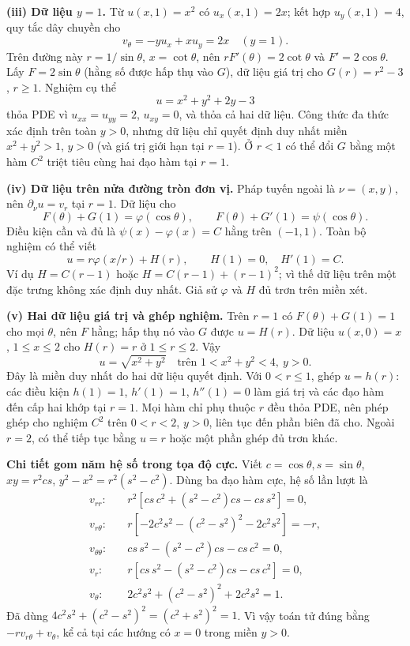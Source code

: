 \textbf{(iii) Dữ liệu $y=1$.} Từ $u(x,1)=x^2$ có $u_x(x,1)=2x$; kết hợp $u_y(x,1)=4$, quy tắc dây chuyền cho
\[v_\theta=-y u_x+xu_y=2x\quad(y=1).\]
Trên đường này $r=1/\sin\theta$, $x=\cot\theta$, nên $rF'(\theta)=2\cot\theta$ và $F'=2\cos\theta$. Lấy $F=2\sin\theta$ (hằng số được hấp thụ vào $G$), dữ liệu giá trị cho $G(r)=r^2-3$, $r\ge1$. Nghiệm cụ thể
\[\boxed{u=x^2+y^2+2y-3}\]
thỏa PDE vì $u_{xx}=u_{yy}=2$, $u_{xy}=0$, và thỏa cả hai dữ liệu. Công thức đa thức xác định trên toàn $y>0$, nhưng dữ liệu chỉ quyết định duy nhất miền $x^2+y^2>1$, $y>0$ (và giá trị giới hạn tại $r=1$). Ở $r<1$ có thể đổi $G$ bằng một hàm $C^2$ triệt tiêu cùng hai đạo hàm tại $r=1$.

\textbf{(iv) Dữ liệu trên nửa đường tròn đơn vị.} Pháp tuyến ngoài là $\nu=(x,y)$, nên $\partial_\nu u=v_r$ tại $r=1$. Dữ liệu cho
\[F(\theta)+G(1)=\varphi(\cos\theta),\qquad F(\theta)+G'(1)=\psi(\cos\theta).\]
Điều kiện cần và đủ là $\psi(x)-\varphi(x)=C$ hằng trên $(-1,1)$. Toàn bộ nghiệm có thể viết
\[u=r\varphi(x/r)+H(r),\qquad H(1)=0,\quad H'(1)=C.\]
Ví dụ $H=C(r-1)$ hoặc $H=C(r-1)+(r-1)^2$; vì thế dữ liệu trên một đặc trưng không xác định duy nhất. Giả sử $\varphi$ và $H$ đủ trơn trên miền xét.

\textbf{(v) Hai dữ liệu giá trị và ghép nghiệm.} Trên $r=1$ có $F(\theta)+G(1)=1$ cho mọi $\theta$, nên $F$ hằng; hấp thụ nó vào $G$ được $u=H(r)$. Dữ liệu $u(x,0)=x$, $1\le x\le2$ cho $H(r)=r$ ở $1\le r\le2$. Vậy
\[\boxed{u=\sqrt{x^2+y^2}\quad\text{trên }1<x^2+y^2<4,\ y>0.}\]
Đây là miền duy nhất do hai dữ liệu quyết định. Với $0<r\le1$, ghép $u=h(r)$: các điều kiện $h(1)=1$, $h'(1)=1$, $h''(1)=0$ làm giá trị và các đạo hàm đến cấp hai khớp tại $r=1$. Mọi hàm chỉ phụ thuộc $r$ đều thỏa PDE, nên phép ghép cho nghiệm $C^2$ trên $0<r<2$, $y>0$, liên tục đến phần biên đã cho. Ngoài $r=2$, có thể tiếp tục bằng $u=r$ hoặc một phần ghép đủ trơn khác.

\textbf{Chi tiết gom năm hệ số trong tọa độ cực.} Viết $c=\cos\theta,s=\sin\theta$, $xy=r^2cs$, $y^2-x^2=r^2(s^2-c^2)$. Dùng ba đạo hàm cực, hệ số lần lượt là
\[\begin{aligned}
v_{rr}:&\quad r^2[cs\,c^2+(s^2-c^2)cs-cs\,s^2]=0,\\
v_{r\theta}:&\quad r[-2c^2s^2-(c^2-s^2)^2-2c^2s^2]=-r,\\
v_{\theta\theta}:&\quad cs\,s^2-(s^2-c^2)cs-cs\,c^2=0,\\
v_r:&\quad r[cs\,s^2-(s^2-c^2)cs-cs\,c^2]=0,\\
v_\theta:&\quad 2c^2s^2+(c^2-s^2)^2+2c^2s^2=1.
\end{aligned}\]
Đã dùng $4c^2s^2+(c^2-s^2)^2=(c^2+s^2)^2=1$. Vì vậy toán tử đúng bằng $-rv_{r\theta}+v_\theta$, kể cả tại các hướng có $x=0$ trong miền $y>0$.

